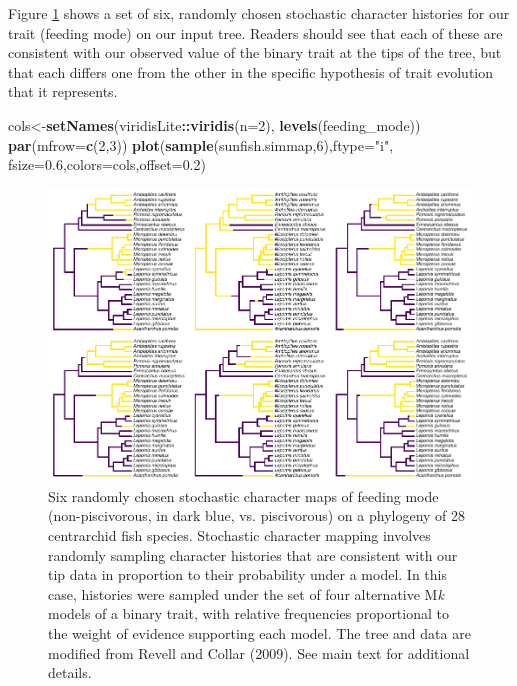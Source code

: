 \documentclass[fleqn,10pt,lineno]{wlpeerj} %
\newenvironment{Shaded}{\begin{snugshade}}{\end{snugshade}}
\newcommand{\AttributeTok}[1]{\textcolor[rgb]{0.13,0.29,0.53}{#1}}
\newcommand{\DecValTok}[1]{\textcolor[rgb]{0.00,0.00,0.81}{#1}}
\newcommand{\FloatTok}[1]{\textcolor[rgb]{0.00,0.00,0.81}{#1}}
\newcommand{\FunctionTok}[1]{\textcolor[rgb]{0.13,0.29,0.53}{\textbf{#1}}}
\newcommand{\NormalTok}[1]{#1}
\newcommand{\OtherTok}[1]{\textcolor[rgb]{0.56,0.35,0.01}{#1}}
\newcommand{\SpecialCharTok}[1]{\textcolor[rgb]{0.81,0.36,0.00}{\textbf{#1}}}
\newcommand{\StringTok}[1]{\textcolor[rgb]{0.31,0.60,0.02}{#1}}
\begin{document}
Figure \ref{fig:simmap-trees} shows a set of six, randomly chosen stochastic character histories for our trait (feeding mode) on our input tree. Readers should see that each of these are consistent with our observed value of the binary trait at the tips of the tree, but that each differs one from the other in the specific hypothesis of trait evolution that it represents.

\begin{Shaded}
\begin{Highlighting}[]
\NormalTok{cols}\OtherTok{\textless{}{-}}\FunctionTok{setNames}\NormalTok{(viridisLite}\SpecialCharTok{::}\FunctionTok{viridis}\NormalTok{(}\AttributeTok{n=}\DecValTok{2}\NormalTok{),}
  \FunctionTok{levels}\NormalTok{(feeding\_mode))}
\FunctionTok{par}\NormalTok{(}\AttributeTok{mfrow=}\FunctionTok{c}\NormalTok{(}\DecValTok{2}\NormalTok{,}\DecValTok{3}\NormalTok{))}
\FunctionTok{plot}\NormalTok{(}\FunctionTok{sample}\NormalTok{(sunfish.simmap,}\DecValTok{6}\NormalTok{),}\AttributeTok{ftype=}\StringTok{"i"}\NormalTok{,}
  \AttributeTok{fsize=}\FloatTok{0.6}\NormalTok{,}\AttributeTok{colors=}\NormalTok{cols,}\AttributeTok{offset=}\FloatTok{0.2}\NormalTok{)}
\end{Highlighting}
\end{Shaded}

\begin{figure}
\includegraphics[width=1\linewidth]{Revell.phytools-v2_peerj_files/figure-latex/simmap-trees-1} \caption{Six randomly chosen stochastic character maps of feeding mode (non-piscivorous, in dark blue, vs. piscivorous) on a phylogeny of 28 centrarchid fish species. Stochastic character mapping involves randomly sampling character histories that are consistent with our tip data in proportion to their probability under a model. In this case, histories were sampled under the set of four alternative M\textit{k} models of a binary trait, with relative frequencies proportional to the weight of evidence supporting each model. The tree and data are modified from Revell and Collar (2009). See main text for additional details.}\label{fig:simmap-trees}
\end{figure}
\end{document}
